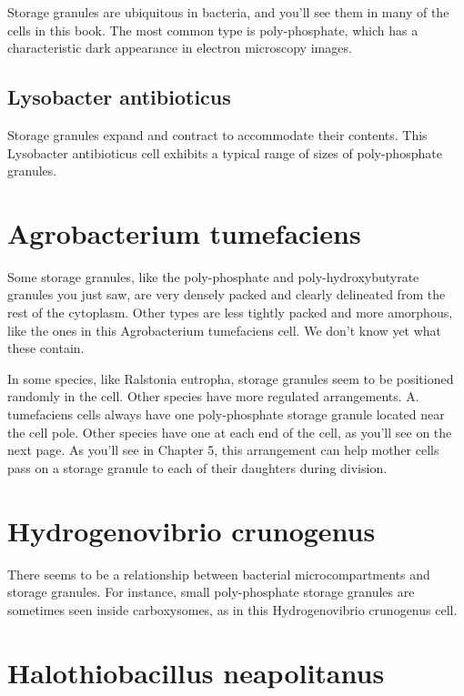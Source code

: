\documentclass[]{tufte-book}
\begin{document}
Storage granules are ubiquitous in bacteria, and you'll see them in many
of the cells in this book. The most common type is poly-phosphate, which
has a characteristic dark appearance in electron microscopy images.

\subsection{Lysobacter antibioticus}\label{Storage_granule_growth}

Storage granules expand and contract to accommodate their contents. This
Lysobacter antibioticus cell exhibits a typical range of sizes of
poly-phosphate granules.

\section{Agrobacterium tumefaciens}\label{agrobacterium-tumefaciens}

Some storage granules, like the poly-phosphate and poly-hydroxybutyrate
granules you just saw, are very densely packed and clearly delineated
from the rest of the cytoplasm. Other types are less tightly packed and
more amorphous, like the ones in this Agrobacterium tumefaciens cell. We
don't know yet what these contain.

In some species, like Ralstonia eutropha, storage granules seem to be
positioned randomly in the cell. Other species have more regulated
arrangements. A. tumefaciens cells always have one poly-phosphate
storage granule located near the cell pole. Other species have one at
each end of the cell, as you'll see on the next page. As you'll see in
Chapter 5, this arrangement can help mother cells pass on a storage
granule to each of their daughters during division.

\section{Hydrogenovibrio crunogenus}\label{hydrogenovibrio-crunogenus}

There seems to be a relationship between bacterial microcompartments and
storage granules. For instance, small poly-phosphate storage granules
are sometimes seen inside carboxysomes, as in this Hydrogenovibrio
crunogenus cell.

\section{Halothiobacillus
neapolitanus}\label{halothiobacillus-neapolitanus}
\end{document}
